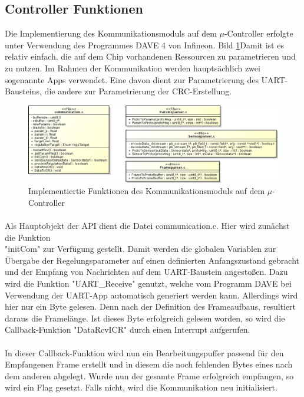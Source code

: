 \subsection{Controller Funktionen}
Die Implementierung des Kommunikationsmoduls auf dem $\mu$-Controller erfolgte unter Verwendung des Programmes DAVE 4 von Infineon. Bild \ref{fig:xmcobj}Damit ist es relativ einfach, die auf dem Chip vorhandenen Ressourcen zu parametrieren und zu nutzen. Im Rahmen der Kommunikation werden hauptsächlich zwei sogenannte Apps verwendet. Eine davon dient zur Parametrierung des UART-Bausteins, die andere zur Parametrierung der CRC-Erstellung.
\begin{figure}
  \includegraphics[width=\textwidth]{XMCObjects}
  \caption{Implementiertie Funktionen des Kommunikationsmoduls auf dem $\mu$-Controller}
  \label{fig:xmcobj}
\end{figure}
\paragraph{}
Als Hauptobjekt der API dient die Datei communication.c. Hier wird zunächst die Funktion \\"initCom" zur Verfügung gestellt. Damit werden die globalen Variablen zur Übergabe der Regelungsparameter auf einen definierten Anfangszustand gebracht und der Empfang von Nachrichten auf dem UART-Baustein angestoßen. Dazu wird die Funktion "UART\_Receive" genutzt, welche vom Programm DAVE bei Verwendung der UART-App automatisch generiert werden kann. Allerdings wird hier nur ein Byte gelesen. Denn nach der Definition des Frameaufbaus, resultiert daraus die Framelänge. Ist dieses Byte erfolgreich gelesen worden, so wird die Callback-Funktion "DataRcvICR" durch einen Interrupt aufgerufen.
\paragraph{}
In dieser Callback-Funktion wird nun ein Bearbeitungspuffer passend für den Empfangenen Frame erstellt und in diesem die noch fehlenden Bytes eines nach dem anderen abgelegt. Wurde nun der gesamte Frame erfolgreich empfangen, so wird ein Flag gesetzt. Falls nicht, wird die Kommunikation neu initialisiert.
